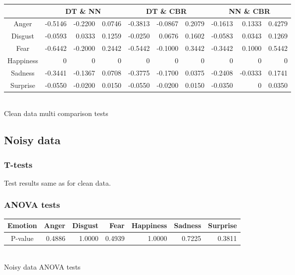 \documentclass[a4paper,11pt]{article}
\begin{document}
    \begin{center}
    \begin{tabular}{|c||r|r|r|r|r|r|r|r|r|} \hline 
    & \multicolumn{3}{|c|}{DT \& NN} & \multicolumn{3}{|c|}{DT \& CBR} & \multicolumn{3}{|c|}{NN \& CBR} \\ \hline \hline
    Anger & -0.5146 & -0.2200 & 0.0746 &-0.3813 & -0.0867 & 0.2079 & -0.1613 & 0.1333 & 0.4279\\ \hline
    Disgust & -0.0593 & 0.0333 & 0.1259 & -0.0250 & 0.0676 & 0.1602 & -0.0583 & 0.0343& 0.1269 \\ \hline
    Fear & -0.6442 & -0.2000 & 0.2442 & -0.5442 & -0.1000 & 0.3442 & -0.3442 & 0.1000 & 0.5442 \\ \hline
    Happiness & 0 & 0 & 0& 0 & 0 & 0 & 0 & 0 & 0 \\ \hline
    Sadness & -0.3441 & -0.1367 & 0.0708 & -0.3775 & -0.1700 & 0.0375 & -0.2408 & -0.0333 & 0.1741 \\ \hline
    Surprise & -0.0550 & -0.0200 & 0.0150 & -0.0550 & -0.0200 & 0.0150 & -0.0350 & 0 & 0.0350 \\ \hline
    \end{tabular}\vspace{5pt}\\
    Clean data multi comparison tests
    \end{center}

\subsection{Noisy data}
\subsubsection{T-tests}
Test results same as for clean data.

\subsubsection{ANOVA tests}

    \begin{center}
    \begin{tabular}{|c||r|r|r|r|r|r|} \hline 
    Emotion & Anger & Disgust & Fear & Happiness & Sadness & Surprise \\ \hline \hline
    P-value & 0.4886 & 1.0000 & 0.4939 & 1.0000 & 0.7225 & 0.3811 \\ \hline
    \end{tabular}\vspace{5pt}\\
    Noisy data ANOVA tests
    \end{center}
\end{document}
